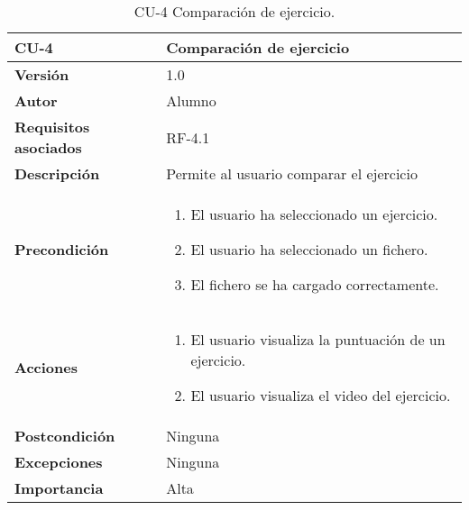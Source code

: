 \begin{table}[p]
	\centering
	\begin{tabularx}{\linewidth}{ p{} p{} }
		\toprule
		\textbf{CU-4}    & \textbf{Comparación de ejercicio}\\
		\toprule
		\textbf{Versión}              & 1.0    \\
		\textbf{Autor}                & Alumno \\
		\textbf{Requisitos asociados} & RF-4.1 \\
		\textbf{Descripción}          & Permite al usuario comparar el ejercicio\\
		\textbf{Precondición}     &    
		\begin{enumerate}		
			\def\labelenumi{\arabic{enumi}.}
			\tightlist
			\item El usuario ha seleccionado un ejercicio.
			\item El usuario ha seleccionado un fichero.
			\item El fichero se ha cargado correctamente.
		\end{enumerate}\\
		\textbf{Acciones}             &
		\begin{enumerate}
			\def\labelenumi{\arabic{enumi}.}
			\tightlist
			\item El usuario visualiza la puntuación de un ejercicio.
			\item El usuario visualiza el video del ejercicio.
		\end{enumerate}\\
		\textbf{Postcondición}        & Ninguna \\
		\textbf{Excepciones}          & Ninguna \\
		\textbf{Importancia}          & Alta \\
		\bottomrule
	\end{tabularx}
	\caption{CU-4 Comparación de ejercicio.}
\end{table}

